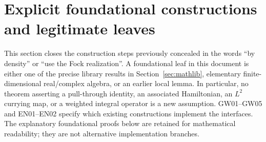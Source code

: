 \documentclass[11pt,a4paper]{article}
\theoremstyle{remark}\newtheorem{remark}[theorem]{Remark}
\begin{document}
\section{Explicit foundational constructions and legitimate leaves}\label{sec:foundations}
This section closes the construction steps previously concealed in the words ``by density'' or ``use the Fock realization''. A foundational leaf in this document is either one of the precise library results in Section~\ref{sec:mathlib}, elementary finite-dimensional real/complex algebra, or an earlier local lemma. In particular, no theorem asserting a pull-through identity, an associated Hamiltonian, an $L^2$ currying map, or a weighted integral operator is a new assumption. GW01--GW05 and EN01--EN02 specify which existing constructions implement the interfaces. The explanatory foundational proofs below are retained for mathematical readability; they are not alternative implementation branches.
\end{document}
